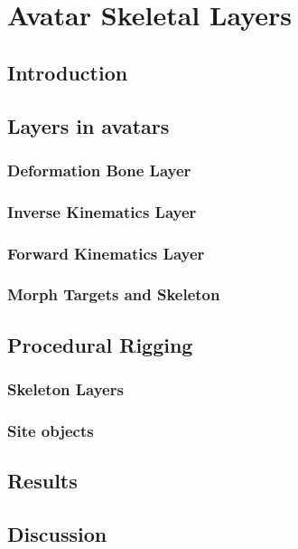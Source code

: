 \documentclass[../../main.tex]{subfiles}
\begin{document}
\chapter{Avatar Skeletal Layers}

\section{Introduction}

\section{Layers in avatars}

\subsection{Deformation Bone Layer}

\subsection{Inverse Kinematics Layer}

\subsection{Forward Kinematics Layer}

\subsection{Morph Targets and Skeleton}

\section{Procedural Rigging}

\subsection{Skeleton Layers}

\subsection{Site objects}

\section{Results}

\section{Discussion}
\end{document}
